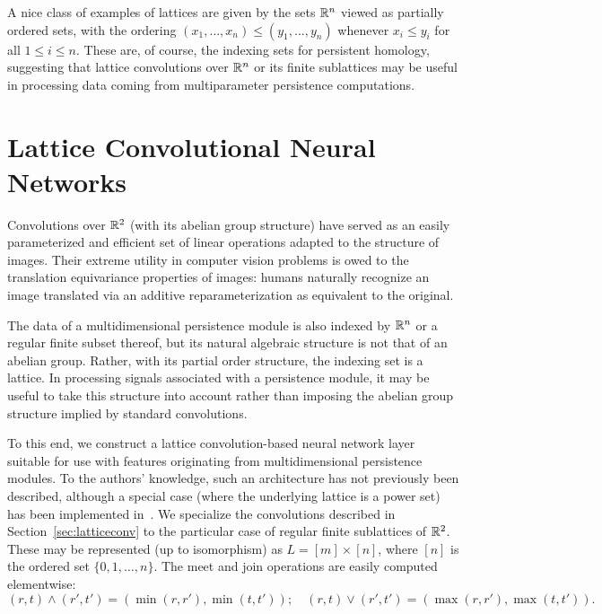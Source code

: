 \documentclass{article}
\begin{document}
A nice class of examples of lattices are given by the sets $\mathbb{R}^n$
viewed as partially ordered sets, with the ordering $(x_1,\ldots,x_n) \leq
(y_1,\ldots,y_n)$ whenever $x_i \leq y_i$ for all $1 \leq i \leq n$. These are,
of course, the indexing sets for persistent homology, suggesting that lattice
convolutions over $\mathbb{R}^n$ or its finite sublattices may be useful in processing
data coming from multiparameter persistence computations. 

\section{Lattice Convolutional Neural Networks}\label{sec:latticeCNN}

Convolutions over $\mathbb{R}^2$ (with its abelian group structure)
have served as an easily parameterized and efficient set of linear operations
adapted to the structure of images. Their extreme utility in computer vision
problems is owed to the translation equivariance properties of images: humans
naturally recognize an image translated via an additive reparameterization as
equivalent to the original.

The data of a multidimensional persistence module is also indexed by $\mathbb{R}^n$ or a
regular finite subset thereof, but its natural algebraic structure is not that
of an abelian group. Rather, with its partial order structure, the indexing set
is a lattice. In processing signals associated with a persistence module, it
may be useful to take this structure into account rather than imposing the
abelian group structure implied by standard convolutions.

To this end, we construct a lattice convolution-based neural network layer
suitable for use with features originating from multidimensional persistence
modules. To the authors' knowledge, such an architecture has not previously been
described, although a special case (where the underlying lattice is a power set)
has been implemented in~\cite{wendler_powerset_2019}. We specialize the convolutions described in
Section~\ref{sec:latticeconv} to the particular case of regular finite
sublattices of $\mathbb{R}^2$. These may be represented (up to isomorphism) as $L = [m]
\times [n]$, where $[n]$ is the ordered set $\{0,1,\dots,n\}$. The meet and join operations are easily computed
elementwise:
\[(r,t) \wedge (r',t') = (\min(r,r'),\min(t,t'));\quad (r,t)\vee (r',t') =
  (\max(r,r'),\max(t,t')).\]
\end{document}
